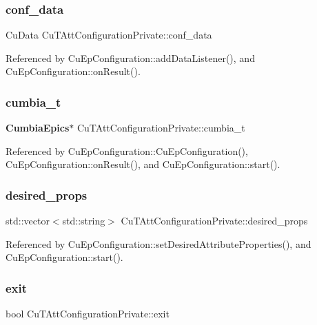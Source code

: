 \subsubsection{conf\+\_\+data}
{\footnotesize\ttfamily Cu\+Data Cu\+T\+Att\+Configuration\+Private\+::conf\+\_\+data}



Referenced by Cu\+Ep\+Configuration\+::add\+Data\+Listener(), and Cu\+Ep\+Configuration\+::on\+Result().

\mbox{\label{classCuTAttConfigurationPrivate_a0504b6cbe2c4fca51b4b83d8aca54990}} 
\subsubsection{cumbia\+\_\+t}
{\footnotesize\ttfamily \textbf{ Cumbia\+Epics}$\ast$ Cu\+T\+Att\+Configuration\+Private\+::cumbia\+\_\+t}



Referenced by Cu\+Ep\+Configuration\+::\+Cu\+Ep\+Configuration(), Cu\+Ep\+Configuration\+::on\+Result(), and Cu\+Ep\+Configuration\+::start().

\mbox{\label{classCuTAttConfigurationPrivate_a28fe555f5ae9ff5423f638cae44323c7}} 
\subsubsection{desired\+\_\+props}
{\footnotesize\ttfamily std\+::vector$<$std\+::string$>$ Cu\+T\+Att\+Configuration\+Private\+::desired\+\_\+props}



Referenced by Cu\+Ep\+Configuration\+::set\+Desired\+Attribute\+Properties(), and Cu\+Ep\+Configuration\+::start().

\mbox{\label{classCuTAttConfigurationPrivate_abe6ccd702a5369d13be8c739029bc007}} 
\subsubsection{exit}
{\footnotesize\ttfamily bool Cu\+T\+Att\+Configuration\+Private\+::exit}

